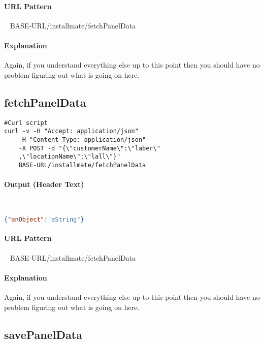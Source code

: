 \documentclass[
10pt, %
letterpaper, %
oneside, %
headinclude,footinclude, %
BCOR5mm, %
]{scrartcl}
\begin{document}
\paragraph{URL Pattern} 
~\newline
BASE-URL/installmate/fetchPanelData

\paragraph{Explanation} Again, if you understand everything else up to this point then you should have no problem figuring out what is going on here.  



\subsection{\textbf{fetchPanelData}}

\begin{lstlisting}
#Curl script
curl -v -H "Accept: application/json" 
	-H "Content-Type: application/json" 
	-X POST -d "{\"customerName\":\"laber\"
	,\"locationName\":\"lall\"}"
	BASE-URL/installmate/fetchPanelData
\end{lstlisting}

\paragraph{Output (Header Text)}~
\begin{lstlisting}[language=json]
{"anObject":"aString"}
\end{lstlisting}

\paragraph{URL Pattern} 
~\newline
BASE-URL/installmate/fetchPanelData

\paragraph{Explanation} Again, if you understand everything else up to this point then you should have no problem figuring out what is going on here.  



\subsection{\textbf{savePanelData}}
\end{document}
